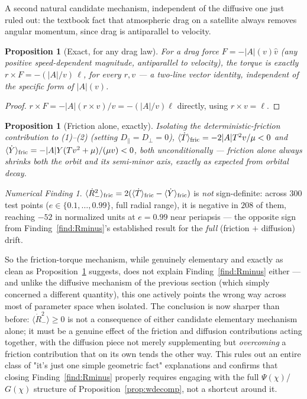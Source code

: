 \documentclass[12pt]{amsart}
\theoremstyle{plain}
\newtheorem{proposition}[theorem]{Proposition}
\theoremstyle{remark}
\newtheorem*{finding}{Numerical Finding}
\begin{document}
A second natural candidate mechanism, independent of the diffusive one just ruled out: the textbook fact that atmospheric drag on a satellite always removes angular momentum, since drag is antiparallel to velocity.

\begin{proposition}[Exact, for any drag law]\label{prop:torque}
For a drag force $F=-|A|(v)\hat v$ (any positive speed-dependent magnitude, antiparallel to velocity), the torque is exactly $r\times F=-(|A|/v)\,\ell$, for every $r,v$ --- a two-line vector identity, independent of the specific form of $|A|(v)$.
\end{proposition}

\begin{proof}
$r\times F=-|A|(r\times v)/v=-(|A|/v)\ell$ directly, using $r\times v=\ell$.
\end{proof}

\begin{proposition}[Friction alone, exactly]\label{prop:fric_only}
Isolating the deterministic-friction contribution to (1)--(2) (setting $D_\parallel=D_\perp=0$), $\langle\dot T\rangle_{\rm fric}=-2|A|T^2v/\mu<0$ and $\langle\dot Y\rangle_{\rm fric}=-|A|Y(Tv^2+\mu)/(\mu v)<0$, both unconditionally --- friction alone always shrinks both the orbit and its semi-minor axis, exactly as expected from orbital decay.
\end{proposition}

\begin{finding}\label{find:fric_fails}
$\langle\dot R_-^2\rangle_{\rm fric}=2(\langle\dot T\rangle_{\rm fric}-\langle\dot Y\rangle_{\rm fric})$ is \emph{not} sign-definite: across $300$ test points ($e\in\{0.1,\dots,0.99\}$, full radial range), it is negative in $208$ of them, reaching $-52$ in normalized units at $e=0.99$ near periapsis --- the opposite sign from Finding~\ref{find:Rminus}'s established result for the \emph{full} (friction $+$ diffusion) drift.
\end{finding}

So the friction-torque mechanism, while genuinely elementary and exactly as clean as Proposition~\ref{prop:torque} suggests, does not explain Finding~\ref{find:Rminus} either --- and unlike the diffusive mechanism of the previous section (which simply concerned a different quantity), this one actively points the wrong way across most of parameter space when isolated. The conclusion is now sharper than before: $\langle\dot R_-^2\rangle\geq0$ is not a consequence of either candidate elementary mechanism alone; it must be a genuine effect of the friction and diffusion contributions acting together, with the diffusion piece not merely supplementing but \emph{overcoming} a friction contribution that on its own tends the other way. This rules out an entire class of "it's just one simple geometric fact" explanations and confirms that closing Finding~\ref{find:Rminus} properly requires engaging with the full $\Psi(\chi)$/$G(\chi)$ structure of Proposition~\ref{prop:wdecomp}, not a shortcut around it.
\end{document}
